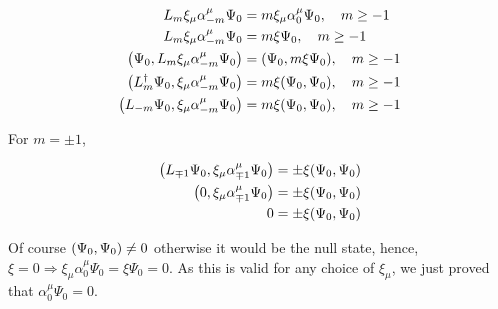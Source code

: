\begin{align*}
    L_m\xi_\mu\alpha_{-m}^\mu\Psi_0&=m\xi_\mu\alpha_{0}^\mu\Psi_0,\ \ \ m\geq -1\\
    L_m\xi_\mu\alpha_{-m}^\mu\Psi_0&=m\xi\Psi_0,\ \ \ m\geq -1\\
    \qty(\Psi_0,L_m\xi_\mu\alpha_{-m}^\mu\Psi_0)&=\qty(\Psi_0,m\xi\Psi_0),\ \ \ m\geq -1\\
    \qty(L_m^\dagger\Psi_0,\xi_\mu\alpha_{-m}^\mu\Psi_0)&=m\xi\qty(\Psi_0,\Psi_0),\ \ \ m\geq -1\\
    \qty(L_{-m}\Psi_0,\xi_\mu\alpha_{-m}^\mu\Psi_0)&=m\xi\qty(\Psi_0,\Psi_0),\ \ \ m\geq -1
\end{align*}

For $m=\pm 1$,

\begin{align*}
    \qty(L_{\mp1}\Psi_0,\xi_\mu\alpha_{\mp1}^\mu\Psi_0)&=\pm \xi\qty(\Psi_0,\Psi_0)\\
    \qty(0,\xi_\mu\alpha_{\mp1}^\mu\Psi_0)&=\pm \xi\qty(\Psi_0,\Psi_0)\\
    0&=\pm \xi\qty(\Psi_0,\Psi_0)
\end{align*}

Of course $\qty(\Psi_0,\Psi_0)\neq 0$ otherwise it would be the null state, hence, $\xi=0\Rightarrow \xi_\mu\alpha_0^\mu\Psi_0=\xi\Psi_0=0$. As this 
is valid for any choice of $\xi_\mu$, we just proved that $\alpha^\mu_0\Psi_0=0$.






